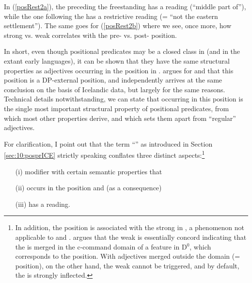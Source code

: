 \documentclass[output=paper,colorlinks,citecolor=brown]{langscibook}
\begin{document}
In (\ref{posRest2a}), the  preceding the freestanding   has a  reading (``middle part of''),  while the one following the  has a restrictive reading (= ``not the eastern settlement''). The same goes for (\ref{posRest2b}) where we see, once more, how strong vs. weak  correlates with the pre- vs. post- position.  

\newpage
In short, even though positional predicates may be a closed class in  (and in the extant early  languages), it can be shown that they have the same structural properties as adjectives occurring in the  position in . \citet{Marib} argues for  and  that this  position is a DP-external position, and \citet{Pfaff2015,Pfaff2017} independently arrives at the same conclusion on the basis of Icelandic data, but largely for the same reasons.  
Technical details notwithstanding, we can state that occurring in this position is the single most important structural property of positional predicates, from which most other properties derive, and which sets them apart from ``regular'' adjectives.  


For clarification, I point out that the term ``'' as introduced in Section \ref{sec:10:posprICE} strictly speaking conflates three distinct aspects:\footnote{\label{famousFootnote}In addition, the  position is associated with the strong  in , a phenomenon not applicable to  and . \citet{Pfaff2015,Pfaff2017} argues that the weak  is essentially  concord indicating that the  is merged in the c-command domain of a  feature in D$^0$, which corresponds to the  position. With adjectives merged outside the  domain (=  position), on the other hand, the weak  cannot be triggered, and by default, the  is strongly inflected.  }

\begin{enumerate}
    \item[(i)] modifier with certain semantic properties that
    \item[(ii)] occurs in the  position and (as a consequence)
    \item[(iii)] has a  reading. 
\end{enumerate}
\end{document}
